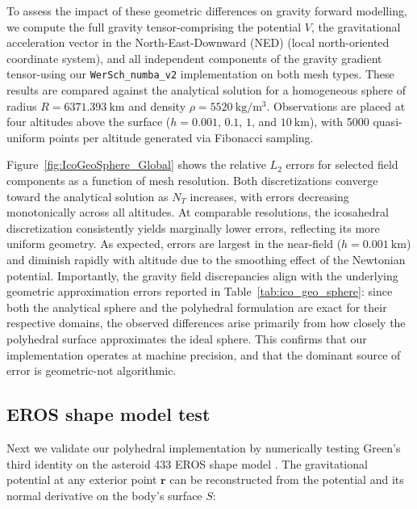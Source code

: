 \documentclass{seg}
\begin{document}
To assess the impact of these geometric differences on gravity forward modelling, we compute the full gravity tensor-comprising the potential $V$, the gravitational acceleration vector in the North-East-Downward (NED) (local north-oriented coordinate system), and all independent components of the gravity gradient tensor-using our \texttt{WerSch\_numba\_v2} implementation on both mesh types. These results are compared against the analytical solution for a homogeneous sphere of radius $R = 6371.393~\mathrm{km}$ and density $\rho = 5520~\mathrm{kg/m^3}$. Observations are placed at four altitudes above the surface ($h = 0.001$, $0.1$, $1$, and $10~\mathrm{km}$), with 5000 quasi-uniform points per altitude generated via Fibonacci sampling.

Figure~\ref{fig:IcoGeoSphere_Global} shows the relative $L_2$ errors for selected field components as a function of mesh resolution. Both discretizations converge toward the analytical solution as $N_T$ increases, with errors decreasing monotonically across all altitudes. At comparable resolutions, the icosahedral discretization consistently yields marginally lower errors, reflecting its more uniform geometry. As expected, errors are largest in the near-field ($h = 0.001~\mathrm{km}$) and diminish rapidly with altitude due to the smoothing effect of the Newtonian potential. Importantly, the gravity field discrepancies align with the underlying geometric approximation errors reported in Table~\ref{tab:ico_geo_sphere}: since both the analytical sphere and the polyhedral formulation are exact for their respective domains, the observed differences arise primarily from how closely the polyhedral surface approximates the ideal sphere. This confirms that our implementation operates at machine precision, and that the dominant source of error is geometric-not algorithmic.

\subsection*{EROS shape model test}

Next we validate our polyhedral implementation by numerically testing Green's third identity \citep{Blakely1995} on the asteroid 433 EROS shape model \citep{Gaskell2020a}. The gravitational potential at any exterior point $\mathbf{r}$ can be reconstructed from the potential and its normal derivative on the body’s surface $S$:
\end{document}
